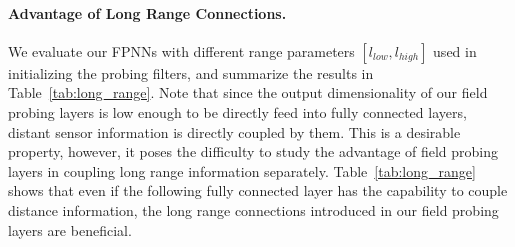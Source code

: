 \begin{table}
	\vspace{-1.2cm}
	\begin{center}
	\end{center}
	\vspace{-0.3cm}
	\caption{Performance with different filter spans.}
	\label{tab:long_range}
	\vspace{-0.4cm}
\end{table}
\paragraph{Advantage of Long Range Connections.}
We evaluate our FPNNs with different range parameters $[l_{low}, l_{high}]$ used in initializing the probing filters, and summarize the results in Table~\ref{tab:long_range}. Note that since the output dimensionality of our field probing layers is low enough to be directly feed into fully connected layers, distant sensor information is directly coupled by them. This is a desirable property, however, it poses the difficulty to study the advantage of field probing layers in coupling long range information separately. Table~\ref{tab:long_range} shows that even if the following fully connected layer has the capability to couple distance information, the long range connections introduced in our field probing layers are beneficial.

\begin{table}
	\vspace{-0.8cm}
	\begin{center}
	\end{center}
	\vspace{-0.3cm}
	\caption{Performance on different field resolutions.}
	\label{tab:field_resolution}
	\vspace{-0.3cm}
\end{table}
